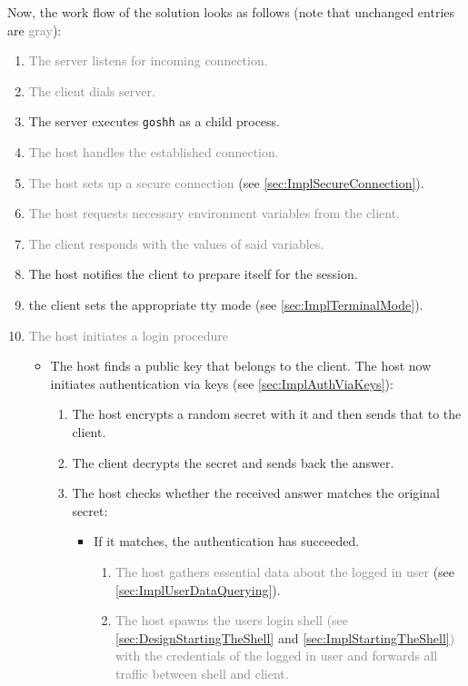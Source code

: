 \documentclass[10pt,a4paper,titlepage,twoside,english,final]{zhawreprt}
\begin{document}
Now, the work flow of the solution looks as follows (note that unchanged entries are \textcolor{gray}{gray}):
\begin{enumerate}
\item \textcolor{gray}{The server listens for incoming connection.}
\item \textcolor{gray}{The client dials server.}
\item The server executes \texttt{goshh} as a child process.
\item \textcolor{gray}{The host handles the established connection.}
\item \textcolor{gray}{The host sets up a secure connection} (see \ref{sec:ImplSecureConnection}).
\item \textcolor{gray}{The host requests necessary environment variables from the client.}
\item \textcolor{gray}{The client responds with the values of said variables.}
\item The host notifies the client to prepare itself for the session.
\item the client sets the appropriate \gls{tty} mode (see \ref{sec:ImplTerminalMode}).
\item \textcolor{gray}{The host initiates a \gls{login} procedure}
\begin{itemize}
	\item The host finds a public key that belongs to the client.
	The host now initiates authentication via keys (see \ref{sec:ImplAuthViaKeys}):
	\begin{enumerate}
		\item The host encrypts a random secret with it and then sends that to the client.
		\item The client decrypts the secret and sends back the answer.
		\item The host checks whether the received answer matches the original secret:
		\begin{itemize}
			\item If it matches, the authentication has succeeded.
			\begin{enumerate}
				\item \textcolor{gray}{The host gathers essential data about the logged in user} (see \ref{sec:ImplUserDataQuerying}).
				\item \textcolor{gray}{The host spawns the users \gls{login} \gls{shell} (see \ref{sec:DesignStartingTheShell}} and \ref{sec:ImplStartingTheShell}\textcolor{gray}{) with the credentials of the logged in user and forwards all traffic between \gls{shell} and client.}

\end{enumerate}
\end{itemize}
\end{enumerate}
\end{itemize}
\end{enumerate}
\end{document}
